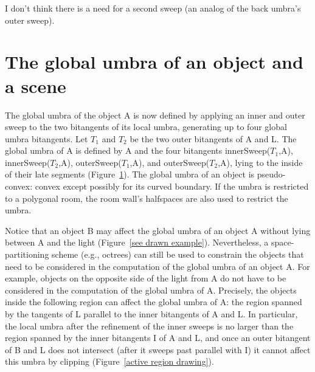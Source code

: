 \documentclass[9pt,twocolumn]{article}
\begin{document}
I don't think there is a need for a second sweep (an analog of the back umbra's outer sweep).


\clearpage

\section{The global umbra of an object and a scene}


The global umbra of the object A is now defined by applying
an inner and outer sweep to the two bitangents of its local umbra,
generating up to four global umbra bitangents.
Let $T_1$ and $T_2$ be the two outer bitangents of A and L.
The global umbra of A is defined by A and the four bitangents
innerSweep($T_1$,A), innerSweep($T_2$,A),
outerSweep($T_1$,A), and outerSweep($T_2$,A),
lying to the inside of their late segments (Figure~\ref{}).
The global umbra of an object is pseudo-convex: convex except possibly
for its curved boundary.
If the umbra is restricted to a polygonal room,
the room wall's halfspaces are also used to restrict the umbra.

Notice that an object B may affect the global umbra of an object A
without lying between A and the light (Figure~\ref{see drawn example}).
Nevertheless, a space-partitioning scheme (e.g., octrees) can still 
be used to constrain
the objects that need to be considered in the computation of the global
umbra of an object A.
For example, objects on the opposite side of the light from A 
do not have to be considered in the computation of the global umbra of A.
Precisely, the objects inside the following region can affect the 
global umbra of A: the region spanned by the tangents of L parallel to 
the inner bitangents of A and L.
In particular, the local umbra after the refinement of the inner sweeps
is no larger than the region spanned by the inner bitangents I of A and L,
and once an outer bitangent of B and L does not intersect
(after it sweeps past parallel with I)
it cannot affect this umbra by clipping (Figure~\ref{active region drawing}).
\end{document}
